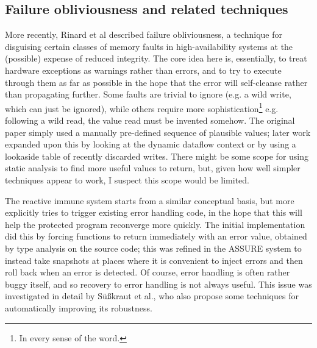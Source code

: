 \subsection{Failure obliviousness and related techniques}
More recently, Rinard et al\cite{Rinard2004} described failure
obliviousness, a technique for disguising certain classes of memory
faults in high-availability systems at the (possible) expense of
reduced integrity.  The core idea here is, essentially, to treat
hardware exceptions as warnings rather than errors, and to try to
execute through them as far as possible in the hope that the error
will self-cleanse rather than propagating further.  Some faults are
trivial to ignore (e.g. a wild write, which can just be ignored),
while others require more sophistication\footnote{In every sense of
  the word.} e.g. following a wild read, the value read must be
invented somehow.  The original paper simply used a manually
pre-defined sequence of plausible values; later work expanded upon
this by looking at the dynamic dataflow context\cite{Nagarajan2009} or
by using a lookaside table of recently discarded
writes\cite{Rinard2005a}.  There might be some scope for using static
analysis to find more useful values to return, but, given how well
simpler techniques appear to work, I suspect this scope would be
limited.

The reactive immune system\cite{Sidiroglou2005} starts from a similar
conceptual basis, but more explicitly tries to trigger existing error
handling code, in the hope that this will help the protected program
reconverge more quickly.  The initial implementation did this by
forcing functions to return immediately with an error value, obtained
by type analysis on the source code; this was refined in the ASSURE
system\cite{Sidiroglou2005} to instead take snapshots at places where
it is convenient to inject errors and then roll back when an error is
detected.  Of course, error handling is often rather buggy itself, and
so recovery to error handling is not always useful.  This issue was
investigated in detail by S\"{u}\ss{}kraut et al.\cite{Susskraut2006},
who also propose some techniques for automatically improving its
robustness.

